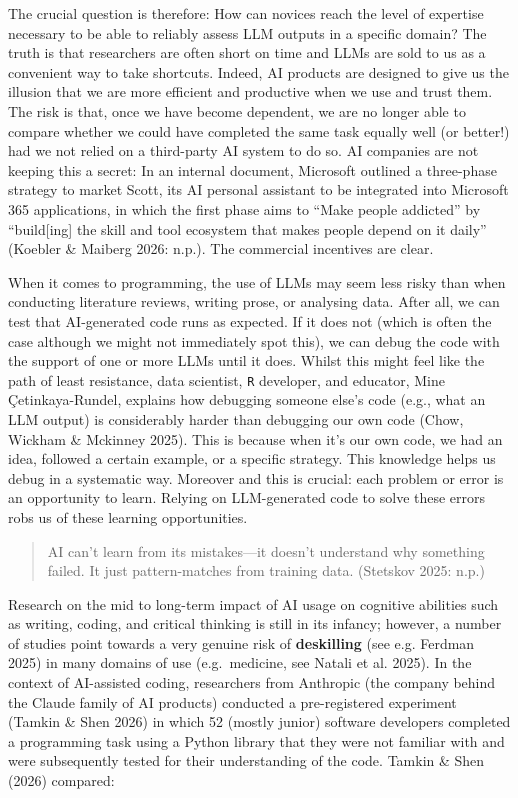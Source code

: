 \documentclass[
  letterpaper,
  DIV=11,
  numbers=noendperiod]{scrreprt}
\begin{document}
The crucial question is therefore: How can novices reach the level of
expertise necessary to be able to reliably assess LLM outputs in a
specific domain? The truth is that researchers are often short on time
and LLMs are sold to us as a convenient way to take shortcuts. Indeed,
AI products are designed to give us the illusion that we are more
efficient and productive when we use and trust them. The risk is that,
once we have become dependent, we are no longer able to compare whether
we could have completed the same task equally well (or better!) had we
not relied on a third-party AI system to do so. AI companies are not
keeping this a secret: In an internal document, Microsoft outlined a
three-phase strategy to market Scott, its AI personal assistant to be
integrated into Microsoft 365 applications, in which the first phase
aims to ``Make people addicted'' by ``build{[}ing{]} the skill and tool
ecosystem that makes people depend on it daily'' (Koebler \& Maiberg
2026: n.p.). The commercial incentives are clear.

When it comes to programming, the use of LLMs may seem less risky than
when conducting literature reviews, writing prose, or analysing data.
After all, we can test that AI-generated code runs as expected. If it
does not (which is often the case although we might not immediately spot
this), we can debug the code with the support of one or more LLMs until
it does. Whilst this might feel like the path of least resistance, data
scientist, \texttt{R} developer, and educator, Mine Çetinkaya-Rundel,
explains how debugging someone else's code (e.g., what an LLM output) is
considerably harder than debugging our own code (Chow, Wickham \&
Mckinney 2025). This is because when it's our own code, we had an idea,
followed a certain example, or a specific strategy. This knowledge helps
us debug in a systematic way. Moreover and this is crucial: each problem
or error is an opportunity to learn. Relying on LLM-generated code to
solve these errors robs us of these learning opportunities.

\begin{quote}
AI can't learn from its mistakes---it doesn't understand why something
failed. It just pattern-matches from training data. (Stetskov 2025:
n.p.)
\end{quote}

Research on the mid to long-term impact of AI usage on cognitive
abilities such as writing, coding, and critical thinking is still in its
infancy; however, a number of studies point towards a very genuine risk
of \textbf{deskilling} (see e.g. Ferdman 2025) in many domains of use
(e.g.~medicine, see Natali et al. 2025). In the context of AI-assisted
coding, researchers from Anthropic (the company behind the Claude family
of AI products) conducted a pre-registered experiment (Tamkin \& Shen
2026) in which 52 (mostly junior) software developers completed a
programming task using a Python library that they were not familiar with
and were subsequently tested for their understanding of the code. Tamkin
\& Shen (2026) compared:
\end{document}

